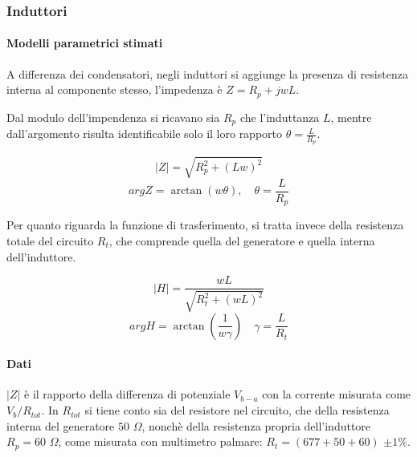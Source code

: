 



















\break
\subsubsection{Induttori}

\paragraph{Modelli parametrici stimati}

A differenza dei condensatori, negli induttori si aggiunge la presenza di resistenza interna al componente stesso, l'impedenza è
$ Z = R_{p} + jwL $.


Dal modulo dell'impendenza si ricavano sia $ R_{p} $ che l'induttanza $L$, mentre dall'argomento risulta identificabile solo il loro rapporto
$ \theta = \frac{L}{R_{p}} $.

$$
|Z| = \sqrt{ R_{p}^2+ (Lw)^{2} }$$
$$
arg Z = \arctan( w\theta ), \quad \theta = \frac{L}{R_{p}}
$$



Per quanto riguarda la funzione di trasferimento, si tratta invece della resistenza totale del circuito $R_{t}$, che comprende quella del generatore e quella interna dell'induttore.

$$
|H| =   \frac{wL}{\sqrt{ R_{t}^{2} + (wL)^{2} } } 
$$
$$
arg H = \arctan( \frac{1}{w\gamma} ) \quad \gamma = \frac{L}{R_{t}}
$$

\paragraph{Dati} $ |Z| $ è il rapporto della differenza di potenziale $  V_{b-a} $ con la corrente misurata come $ V_{b} / R_{tot} $. In $ R_{tot} $ si tiene conto sia del resistore nel circuito, che della resistenza interna del generatore $50$ $\Omega$, nonchè della resistenza propria dell'induttore $R_{p} = 60$ $\Omega$, come misurata con multimetro palmare:
$ R_{t} = (677 + 50 + 60 )$ $\pm 1\%$.

